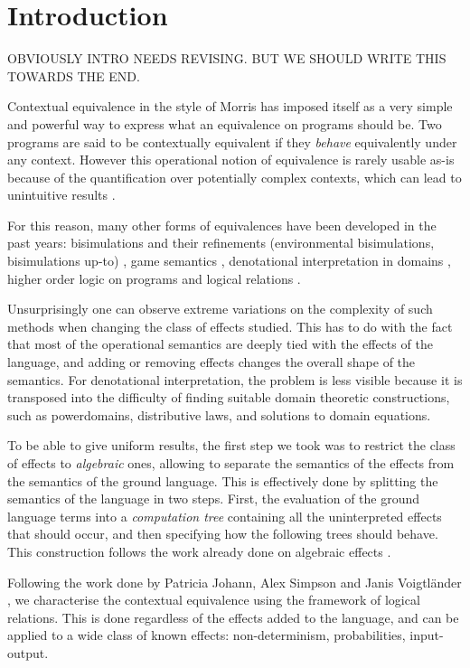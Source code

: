 \section{Introduction}

OBVIOUSLY INTRO NEEDS REVISING. BUT WE SHOULD WRITE THIS TOWARDS THE END.

Contextual equivalence in the style of Morris
has imposed itself as a very simple and powerful
way to express what an equivalence on programs should be. 
Two programs are said to be contextually equivalent if 
they \emph{behave} equivalently under any context. 
However this operational notion of equivalence is rarely usable 
as-is because of the quantification over potentially complex 
contexts, which can lead to unintuitive results \cite{pitts1997operationally}.

For this reason, many other forms of equivalences have 
been developed in the past years: bisimulations 
and their refinements (environmental bisimulations, 
bisimulations up-to) \cite{koutavas2011applicative}, 
game semantics \cite{abramsky1999game}, 
denotational interpretation in domains \cite{scott1982domains}, 
higher order logic on 
programs \cite{honda2005observationally} 
and logical relations \cite{Pitts2000}.

Unsurprisingly one can observe extreme variations on 
the complexity of such methods when changing  
the class of effects studied. This has to do with 
the fact that most of the operational semantics 
are deeply tied with the effects of the language, 
and adding or removing effects changes the overall 
shape of the semantics. For denotational interpretation,
the problem is less visible because it is transposed 
into the difficulty of finding suitable domain theoretic constructions, 
such as powerdomains, distributive laws,
and solutions to domain equations.

To be able to give uniform results, the first 
step we took was to restrict the class of effects
to \emph{algebraic} ones, 
allowing to separate the semantics 
of the effects from the semantics of the ground language. 
This is effectively done by splitting the semantics of 
the language in two steps. First, the evaluation 
of the ground language terms into a \emph{computation tree}
containing all the uninterpreted effects that should occur, 
and then specifying how the following trees should behave.
This construction follows the work already done on 
algebraic effects \cite{plotkin2001adequacy}.


Following the work done by Patricia
Johann, Alex Simpson and Janis Voigtl\"ander \cite{gom}, we 
characterise the contextual equivalence using the framework 
of logical relations. This is done regardless of the 
effects added to the language, and can be applied to a wide 
class of known effects: non-determinism, probabilities, input-output.

